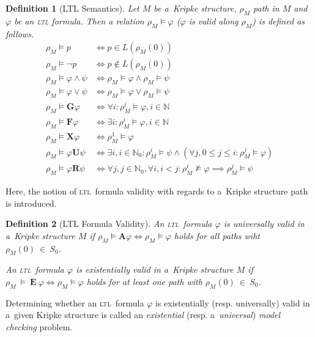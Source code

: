 \documentclass[12pt,twoside,draft]{fithesis}
\newcommand{\ltl}{\textsc{ltl}~}
\newcommand{\mNatural}{\mathbb{N}}
\newcommand{\bF}{\mathbf{F}}
\newcommand{\bG}{\mathbf{G}}
\newcommand{\bX}{\mathbf{X}}
\newcommand{\bU}{\mathbf{U}}
\newcommand{\bR}{\mathbf{R}}
\newcommand{\bA}{\mathbf{A}}
\newcommand{\bE}{\mathbf{E}}
\newtheorem{mydef}{Definition}
\begin{document}
\begin{mydef}[LTL Semantics]
Let $M$ be a~Kripke structure, $\rho_M$ path in $M$ and $\varphi$ be
an \textsc{ltl} formula. Then a relation $\rho_M\models\varphi$
($\varphi$ is valid along $\rho_M$) is defined as follows\cite{clarke}.
\begin{align}
	\rho_M\models p&\iff p\in L(\rho_M(0))\\
	\rho_M\models\neg p&\iff p\notin L(\rho_M(0))\\
	\rho_M\models \varphi\wedge\psi&\iff\rho_M\models\varphi\wedge
		\rho_M\models\psi\\
	\rho_M\models \varphi\vee\psi&\iff\rho_M\models\varphi\vee
		\rho_M\models\psi\\
	\rho_M\models\bG\varphi&\iff\forall i:\rho_M^i\models\varphi,
		i\in\mNatural\\
	\rho_M\models\bF\varphi&\iff\exists i:\rho_M^i\models\varphi,
		i\in\mNatural\\
	\rho_M\models\bX\varphi&\iff\rho_M^1\models\varphi\\
	\rho_M\models\varphi\bU\psi&\iff\exists i,i\in\mNatural_0:
		\rho_M^i\models\psi\wedge(\forall j,0\leq j\leq i:
			\rho_M^j\models\varphi)\\
	\rho_M\models\varphi\bR\psi&\iff\forall j,j\in\mNatural_0,
		\forall i,i<j:\rho_M^i\not\models\varphi\implies
			\rho_M^j\models\psi
\end{align}
\end{mydef}

Here, the notion of \ltl formula validity with regards to a~Kripke
structure path is introduced.
\begin{mydef}[LTL Formula Validity]
An \ltl formula $\varphi$ is universally valid in a~Kripke structure $M$
if $\rho_M\models\bA\varphi\iff\rho_M\models\varphi$ holds for all
paths wiht $\rho_M(0)~\in~S_0$.

An \ltl formula $\varphi$ is existentially valid in a~Kripke structure
$M$ if $\rho_M~\models~\bE~\varphi\iff\rho_M\models\varphi$ holds for
at least one path with $\rho_M(0)~\in~S_0$\cite{biere}.
\end{mydef}

Determining whether an \ltl formula $\varphi$ is existentially (resp.
universally) valid in a~given Kripke structure is called an
\emph{existential} (resp. a~\emph{universal}) \emph{model checking}
problem\cite{biere}.
\end{document}

